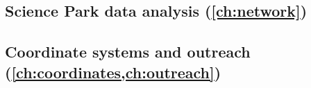 \subsection{Science Park data analysis
            (\cref{ch:network})}



\subsection{Coordinate systems and outreach 
            (\cref{ch:coordinates,ch:outreach})}


















